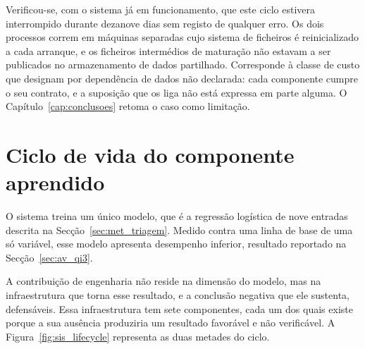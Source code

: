 Verificou-se, com o sistema já em funcionamento, que este ciclo estivera interrompido durante
dezanove dias sem registo de qualquer erro. Os dois processos correm em máquinas separadas cujo
sistema de ficheiros é reinicializado a cada arranque, e os ficheiros intermédios de maturação não
estavam a ser publicados no armazenamento de dados partilhado. Corresponde à classe de custo que
\textcite{sculley2015debt} designam por dependência de dados não declarada: cada componente cumpre
o seu contrato, e a suposição que os liga não está expressa em parte alguma. O
Capítulo~\ref{cap:conclusoes} retoma o caso como limitação.

\section{Ciclo de vida do componente aprendido}
\label{sec:sis_ciclo}

O sistema treina um único modelo, que é a regressão logística de nove entradas descrita na
Secção~\ref{sec:met_triagem}. Medido contra uma linha de base de uma só variável, esse modelo
apresenta desempenho inferior, resultado reportado na Secção~\ref{sec:av_qi3}.

A contribuição de engenharia não reside na dimensão do modelo, mas na infraestrutura que torna
esse resultado, e a conclusão negativa que ele sustenta, defensáveis. Essa infraestrutura tem sete
componentes, cada um dos quais existe porque a sua ausência produziria um resultado favorável e
não verificável. A Figura~\ref{fig:sis_lifecycle} representa as duas metades do ciclo.

